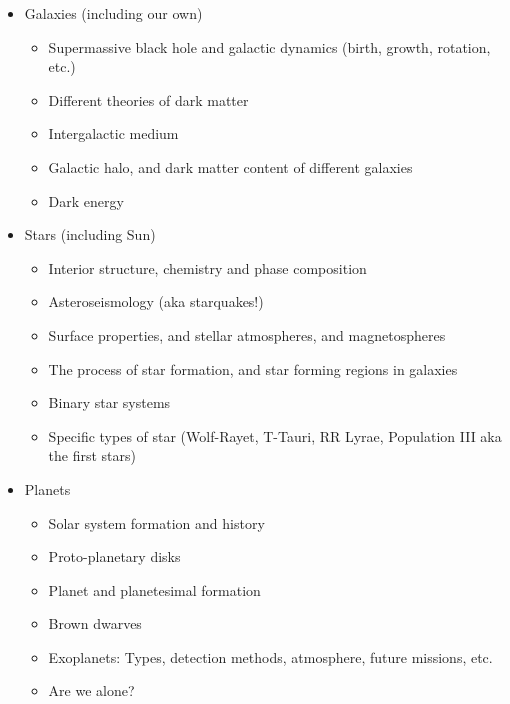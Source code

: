 \documentclass[11pt]{article}
\begin{document}
\begin{itemize}[noitemsep]
    \item Galaxies (including our own)
        \begin{itemize}[noitemsep]
            \item Supermassive black hole and galactic dynamics (birth, growth, rotation, etc.)
            \item Different theories of dark matter
            \item Intergalactic medium
            \item Galactic halo, and dark matter content of different galaxies
            \item Dark energy
        \end{itemize}

    \item Stars (including Sun)
        \begin{itemize}[noitemsep]
            \item Interior structure, chemistry and phase composition
            \item Asteroseismology (aka starquakes!)
            \item Surface properties, and stellar atmospheres, and magnetospheres
            \item The process of star formation, and star forming regions in galaxies
            \item Binary star systems
            \item Specific types of star (Wolf-Rayet, T-Tauri, RR Lyrae, Population III aka the first stars)
        \end{itemize}

    \item Planets
        \begin{itemize}[noitemsep]
            \item Solar system formation and history
            \item Proto-planetary disks
            \item Planet and planetesimal formation
            \item Brown dwarves
            \item Exoplanets: Types, detection methods, atmosphere, future missions, etc.
            \item Are we alone?
        \end{itemize}
    

\end{itemize}
\end{document}
